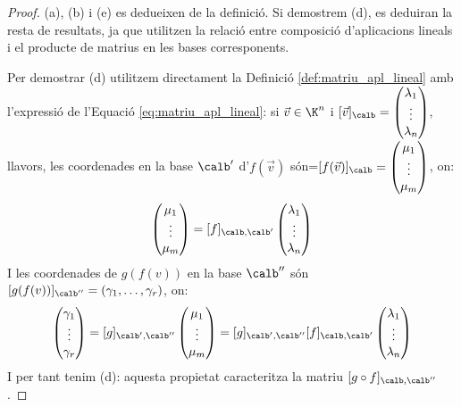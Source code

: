 \begin{proof}
    (a), (b) i (e) es dedueixen de la definició. Si demostrem (d), es deduiran la resta de resultats, ja que utilitzen la relació entre composició d'aplicacions lineals i el producte de matrius en les bases corresponents.
    
    Per demostrar (d) utilitzem directament la Definició \ref{def:matriu_apl_lineal} amb l'expressió de l'Equació \eqref{eq:matriu_apl_lineal}: si $\vec v\in \K^n$ i $[\vec v]_\calb=\begin{pmatrix}\lambda_1\\\vdots\\\lambda_n\end{pmatrix}$, llavors, les coordenades en la base $\calb'$ d'$f(\vec v)$  són=$[f(\vec v)]_\calb = \begin{pmatrix}\mu_1\\\vdots\\\mu_m\end{pmatrix}$, on: 
    $$
    \begin{pmatrix}\mu_1\\ \vdots \\ \mu_m \end{pmatrix}=[f]_{\calb,\calb'}\begin{pmatrix}\lambda_1 \\ \vdots \\ \lambda_n \end{pmatrix}
    $$
    I les coordenades de $g(f(v))$ en la base $\calb''$ són $[g(f(v))]_{\calb''}=(\gamma_1,\dots,\gamma_r)$, on:
    $$
    \begin{pmatrix}\gamma_1\\ \vdots \\ \gamma_r \end{pmatrix}=[g]_{\calb',\calb''}\begin{pmatrix}\mu_1 \\ \vdots \\ \mu_m \end{pmatrix}=
    [g]_{\calb',\calb''} [f]_{\calb,\calb'}\begin{pmatrix}\lambda_1 \\ \vdots \\ \lambda_n \end{pmatrix}
    $$
    I per tant tenim (d): aquesta propietat caracteritza la matriu $[g\circ f]_{\calb,\calb''}$.
\end{proof}

